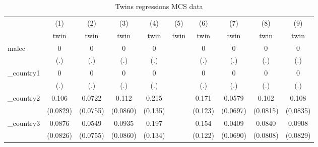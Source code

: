 \begin{table}[htbp]\centering
\def\sym#1{\ifmmode^{#1}\else\(^{#1}\)\fi}
\caption{Twins regressions MCS data}
\begin{tabular}{l*{9}{c}}
\hline\hline
            &\multicolumn{1}{c}{(1)}&\multicolumn{1}{c}{(2)}&\multicolumn{1}{c}{(3)}&\multicolumn{1}{c}{(4)}&\multicolumn{1}{c}{(5)}&\multicolumn{1}{c}{(6)}&\multicolumn{1}{c}{(7)}&\multicolumn{1}{c}{(8)}&\multicolumn{1}{c}{(9)}\\
            &\multicolumn{1}{c}{twin}&\multicolumn{1}{c}{twin}&\multicolumn{1}{c}{twin}&\multicolumn{1}{c}{twin}&\multicolumn{1}{c}{twin}&\multicolumn{1}{c}{twin}&\multicolumn{1}{c}{twin}&\multicolumn{1}{c}{twin}&\multicolumn{1}{c}{twin}\\
\hline
malec       &           0         &           0         &           0         &           0         &                     &           0         &           0         &           0         &           0         \\
            &         (.)         &         (.)         &         (.)         &         (.)         &                     &         (.)         &         (.)         &         (.)         &         (.)         \\
[1em]
\_country1   &           0         &           0         &           0         &           0         &                     &           0         &           0         &           0         &           0         \\
            &         (.)         &         (.)         &         (.)         &         (.)         &                     &         (.)         &         (.)         &         (.)         &         (.)         \\
[1em]
\_country2   &       0.106         &      0.0722         &       0.112         &       0.215         &                     &       0.171         &      0.0579         &       0.102         &       0.108         \\
            &    (0.0829)         &    (0.0755)         &    (0.0860)         &     (0.135)         &                     &     (0.123)         &    (0.0697)         &    (0.0815)         &    (0.0835)         \\
[1em]
\_country3   &      0.0876         &      0.0549         &      0.0935         &       0.197         &                     &       0.154         &      0.0409         &      0.0840         &      0.0908         \\
            &    (0.0826)         &    (0.0755)         &    (0.0860)         &     (0.134)         &                     &     (0.122)         &    (0.0690)         &    (0.0808)         &    (0.0829)         \\

\end{tabular}
\end{table}
